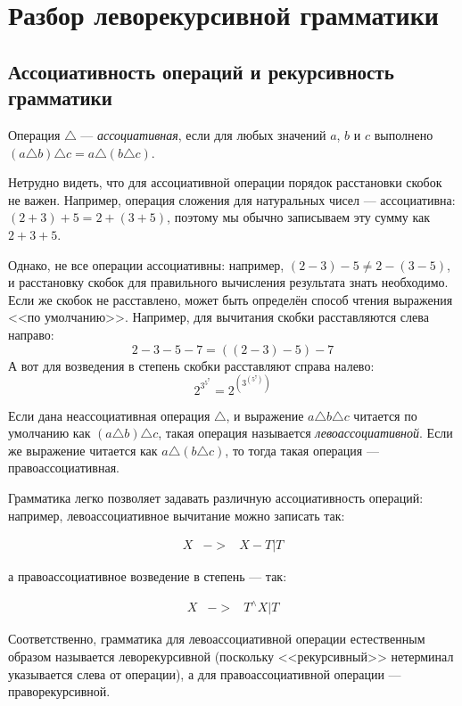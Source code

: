 \documentclass[12pt]{article}
\begin{document}
\section{Разбор леворекурсивной грамматики}

\subsection{Ассоциативность операций и рекурсивность грамматики}

\begin{definition}
Операция $\triangle$ --- \emph{ассоциативная}, если для любых значений $a$, $b$ и $c$
выполнено $(a \triangle b) \triangle c = a \triangle (b \triangle c)$.
\end{definition}

Нетрудно видеть, что для ассоциативной операции порядок расстановки скобок не важен.
Например, операция сложения для натуральных чисел --- ассоциативна:
$(2+3)+5 = 2+(3+5)$, поэтому мы обычно записываем эту сумму как $2+3+5$.

Однако, не все операции ассоциативны: например, $(2-3)-5 \ne 2-(3-5)$, и расстановку 
скобок для правильного вычисления результата знать необходимо.
Если же скобок не расставлено, может быть определён способ чтения выражения <<по умолчанию>>.
Например, для вычитания скобки расставляются слева направо:
$$2-3-5-7 = ((2-3)-5)-7$$
А вот для возведения в степень скобки расставляют справа налево:
$$2^{3^{5^7}} = 2^{\left(3^{\left(5^7\right)}\right)}$$

\begin{definition}
Если дана неассоциативная операция $\triangle$, и выражение $a \triangle b \triangle c$
читается по умолчанию как $(a \triangle b) \triangle c$, такая операция называется
\emph{левоассоциативной}. Если же выражение читается как $a \triangle (b \triangle c)$,
то тогда такая операция --- правоассоциативная.
\end{definition}

Грамматика легко позволяет задавать различную ассоциативность операций:
например, левоассоциативное вычитание можно записать так:
\begin{bnf}\begin{eqnarray*}
X &->& X-T | T
\end{eqnarray*}\end{bnf}%
а правоассоциативное возведение в степень --- так:
\begin{bnf}\begin{eqnarray*}
X &->& T^\wedge X | T
\end{eqnarray*}\end{bnf}%
Соответственно, грамматика для левоассоциативной операции естественным образом называется
леворекурсивной (поскольку <<рекурсивный>> нетерминал указывается слева от операции),
а для правоассоциативной операции --- праворекурсивной.
\end{document}
